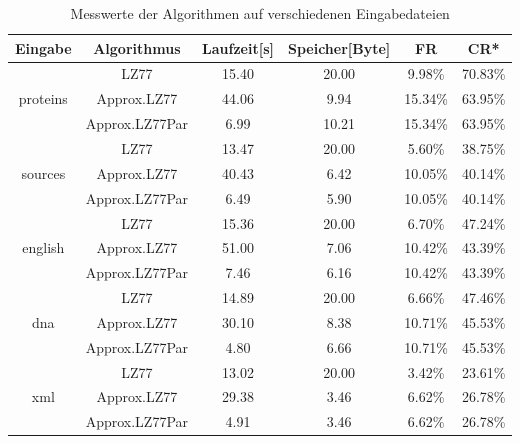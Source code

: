 \begin{table}[ht]
    \centering
    \caption{Messwerte der Algorithmen auf verschiedenen Eingabedateien}
    \label{messwerte}
    \begin{tabular} { |c|c|c|c|c|c| }
        \hline
        \textbf{Eingabe} & \textbf{Algorithmus} & \textbf{Laufzeit[s]} & \textbf{Speicher[Byte]} & \textbf{FR} & \textbf{CR*} \\
        \hline
        & LZ77 & 15.40 & 20.00 & 9.98\% & 70.83\% \\
        proteins & Approx.LZ77 & 44.06 & 9.94 & 15.34\% & 63.95\% \\
        & Approx.LZ77Par & 6.99 & 10.21 & 15.34\% & 63.95\% \\
        \hline
        & LZ77 & 13.47 & 20.00 & 5.60\% & 38.75\% \\
        sources & Approx.LZ77 & 40.43 & 6.42 & 10.05\% & 40.14\% \\
        & Approx.LZ77Par & 6.49 & 5.90 & 10.05\% & 40.14\% \\
        \hline
        & LZ77 & 15.36 & 20.00 & 6.70\% & 47.24\% \\
        english & Approx.LZ77 & 51.00 & 7.06 & 10.42\% & 43.39\% \\
        & Approx.LZ77Par & 7.46 & 6.16 & 10.42\% & 43.39\% \\
        \hline
        & LZ77 & 14.89 & 20.00 & 6.66\% & 47.46\% \\
        dna & Approx.LZ77 & 30.10 & 8.38 & 10.71\% & 45.53\% \\
        & Approx.LZ77Par & 4.80 & 6.66 & 10.71\% & 45.53\% \\
        \hline
        & LZ77 & 13.02 & 20.00 & 3.42\% & 23.61\% \\
        xml & Approx.LZ77 & 29.38 & 3.46 & 6.62\% & 26.78\% \\
        & Approx.LZ77Par & 4.91 & 3.46 & 6.62\% & 26.78\% \\
        \hline
    \end{tabular}
\end{table}

